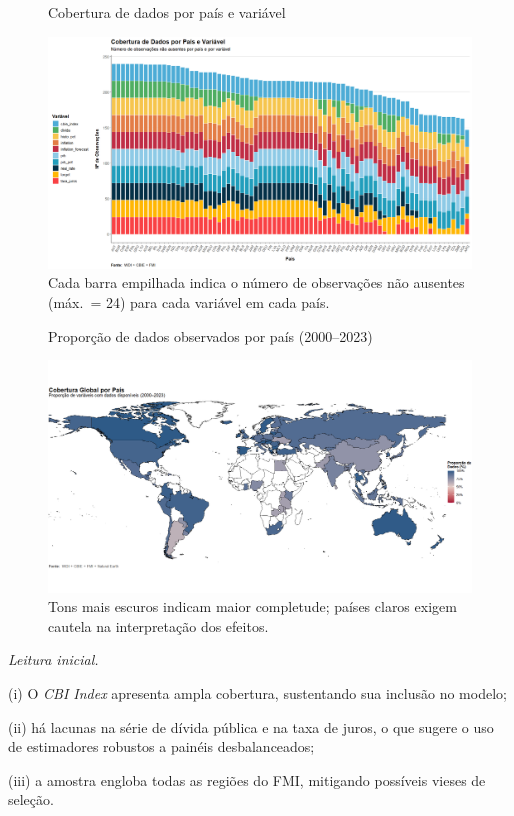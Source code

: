\documentclass[a4paper,12pt]{article}[abnt2]
\begin{document}
\begin{figure}[H]
    \centering
    \caption{Cobertura de dados por país e variável}
    \includegraphics[width=.85\linewidth]{Imagens/an1i1.png}
    \caption*{\footnotesize Cada barra empilhada indica o número de observações não ausentes (máx.\ = 24) para cada variável em cada país.}
\end{figure}

\begin{figure}[H]
    \centering
    \caption{Proporção de dados observados por país (2000–2023)}
    \includegraphics[width=.85\linewidth]{Imagens/an1i2.png}
    \caption*{\footnotesize Tons mais escuros indicam maior completude; países claros exigem cautela na interpretação dos efeitos.}
\end{figure}

\vspace{.5em}
\noindent\textit{Leitura inicial.}  

(i) O \emph{CBI Index} apresenta ampla cobertura, sustentando sua inclusão no modelo;  

(ii) há lacunas na série de dívida pública e na taxa de juros, o que sugere o uso de estimadores robustos a painéis desbalanceados;  

(iii) a amostra engloba todas as regiões do FMI, mitigando possíveis vieses de seleção.
\end{document}
